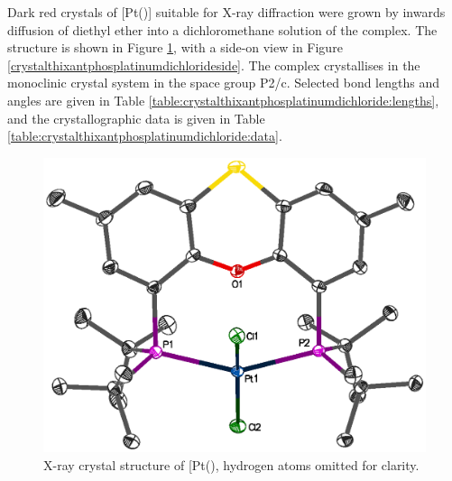 Dark red crystals of [Pt(\tButhixantphos)] suitable for X-ray diffraction were grown by inwards diffusion of diethyl ether into a dichloromethane solution of the complex.  The structure is shown in Figure \ref{crystalthixantphosplatinumdichloride}, with a side-on view in Figure \ref{crystalthixantphosplatinumdichlorideside}.  The complex crystallises in the monoclinic crystal system in the space group P2/c.  Selected bond lengths and angles are given in Table \ref{table:crystalthixantphosplatinumdichloride:lengths}, and the crystallographic data is given in Table \ref{table:crystalthixantphosplatinumdichloride:data}.  

\begin{figure}[htbp]
\begin{center}
\vspace{0.5cm}
\includegraphics[scale=0.8]{../Figures/Crystalthixantphosplatinumdichloride.eps}
\caption[X-ray crystal structure of [Pt(\tButhixantphos)\ce{Cl2]}]{X-ray crystal structure of [Pt(\tButhixantphos)\ce{Cl2]}, hydrogen atoms omitted for clarity.}
\label{crystalthixantphosplatinumdichloride}
\end{center}
\end{figure}
\vspace{0.2cm}

